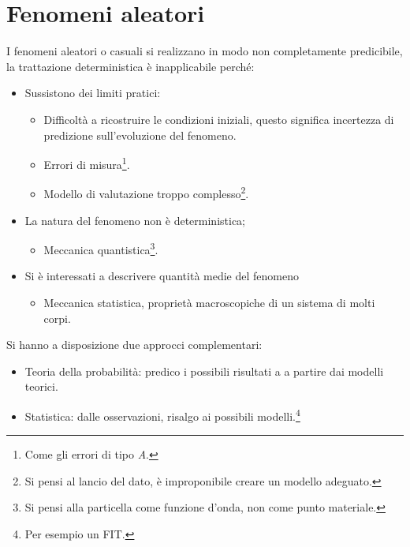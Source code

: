 \documentclass[11pt,a4paper]{book}
\begin{document}
\section{Fenomeni aleatori}
I fenomeni aleatori o casuali si realizzano in modo non completamente predicibile, la trattazione deterministica è inapplicabile perché:
\begin{itemize}
\item Sussistono dei limiti pratici:
\begin{itemize}
\item Difficoltà a ricostruire le condizioni iniziali, questo significa incertezza di predizione sull'evoluzione del fenomeno.
\item Errori di misura\footnote{Come gli errori di tipo \textit{A}.}.
\item Modello di valutazione troppo complesso\footnote{Si pensi al lancio del dato, è improponibile creare un modello adeguato.}.
\end{itemize}
\item La natura del fenomeno non è deterministica;
\begin{itemize}
\item Meccanica quantistica\footnote{Si pensi alla particella come funzione d'onda, non come punto materiale.}.
\end{itemize}
\item Si è interessati a descrivere quantità medie del fenomeno
\begin{itemize}
\item Meccanica statistica, proprietà macroscopiche di un sistema di molti corpi.
\end{itemize}
\end{itemize}
Si hanno a disposizione due approcci complementari:
\begin{itemize}
\item Teoria della probabilità: predico i possibili risultati a a partire dai modelli teorici.
\item Statistica: dalle osservazioni, risalgo ai possibili modelli.\footnote{Per esempio un FIT.}
\end{itemize}
\end{document}
